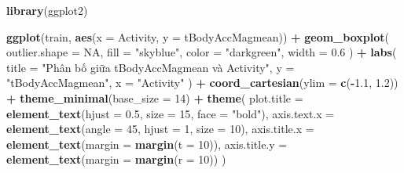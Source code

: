 \documentclass[
]{article}
\newenvironment{Shaded}{\begin{snugshade}}{\end{snugshade}}
\newcommand{\AttributeTok}[1]{\textcolor[rgb]{0.13,0.29,0.53}{#1}}
\newcommand{\ConstantTok}[1]{\textcolor[rgb]{0.56,0.35,0.01}{#1}}
\newcommand{\DecValTok}[1]{\textcolor[rgb]{0.00,0.00,0.81}{#1}}
\newcommand{\FloatTok}[1]{\textcolor[rgb]{0.00,0.00,0.81}{#1}}
\newcommand{\FunctionTok}[1]{\textcolor[rgb]{0.13,0.29,0.53}{\textbf{#1}}}
\newcommand{\NormalTok}[1]{#1}
\newcommand{\SpecialCharTok}[1]{\textcolor[rgb]{0.81,0.36,0.00}{\textbf{#1}}}
\newcommand{\StringTok}[1]{\textcolor[rgb]{0.31,0.60,0.02}{#1}}
\begin{document}
\begin{Shaded}
\begin{Highlighting}[]
\FunctionTok{library}\NormalTok{(ggplot2)}

\FunctionTok{ggplot}\NormalTok{(train, }\FunctionTok{aes}\NormalTok{(}\AttributeTok{x =}\NormalTok{ Activity, }\AttributeTok{y =}\NormalTok{ tBodyAccMagmean)) }\SpecialCharTok{+}
  \FunctionTok{geom\_boxplot}\NormalTok{(}
    \AttributeTok{outlier.shape =} \ConstantTok{NA}\NormalTok{,}
    \AttributeTok{fill =} \StringTok{"skyblue"}\NormalTok{,}
    \AttributeTok{color =} \StringTok{"darkgreen"}\NormalTok{,}
    \AttributeTok{width =} \FloatTok{0.6}
\NormalTok{  ) }\SpecialCharTok{+}
  \FunctionTok{labs}\NormalTok{(}
    \AttributeTok{title =} \StringTok{"Phân bố giữa tBodyAccMagmean và Activity"}\NormalTok{,}
    \AttributeTok{y =} \StringTok{"tBodyAccMagmean"}\NormalTok{,}
    \AttributeTok{x =} \StringTok{"Activity"}
\NormalTok{  ) }\SpecialCharTok{+}
  \FunctionTok{coord\_cartesian}\NormalTok{(}\AttributeTok{ylim =} \FunctionTok{c}\NormalTok{(}\SpecialCharTok{{-}}\FloatTok{1.1}\NormalTok{, }\FloatTok{1.2}\NormalTok{)) }\SpecialCharTok{+} 
  \FunctionTok{theme\_minimal}\NormalTok{(}\AttributeTok{base\_size =} \DecValTok{14}\NormalTok{) }\SpecialCharTok{+}
  \FunctionTok{theme}\NormalTok{(}
    \AttributeTok{plot.title =} \FunctionTok{element\_text}\NormalTok{(}\AttributeTok{hjust =} \FloatTok{0.5}\NormalTok{, }\AttributeTok{size =} \DecValTok{15}\NormalTok{, }\AttributeTok{face =} \StringTok{"bold"}\NormalTok{),}
    \AttributeTok{axis.text.x =} \FunctionTok{element\_text}\NormalTok{(}\AttributeTok{angle =} \DecValTok{45}\NormalTok{, }\AttributeTok{hjust =} \DecValTok{1}\NormalTok{, }\AttributeTok{size =} \DecValTok{10}\NormalTok{),}
    \AttributeTok{axis.title.x =} \FunctionTok{element\_text}\NormalTok{(}\AttributeTok{margin =} \FunctionTok{margin}\NormalTok{(}\AttributeTok{t =} \DecValTok{10}\NormalTok{)),}
    \AttributeTok{axis.title.y =} \FunctionTok{element\_text}\NormalTok{(}\AttributeTok{margin =} \FunctionTok{margin}\NormalTok{(}\AttributeTok{r =} \DecValTok{10}\NormalTok{))}
\NormalTok{  )}
\end{Highlighting}
\end{Shaded}
\end{document}

